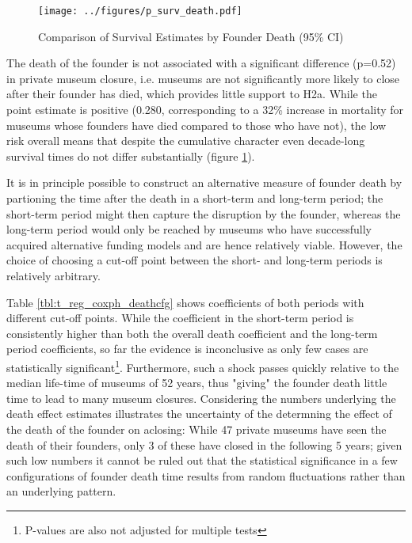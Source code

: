 \documentclass[12pt]{article}
\begin{document}
\begin{figure}[htbp]
\centering
\texttt{[image: ../figures/p\_surv\_death.pdf]}
\caption{\label{fig:p_surv_death}Comparison of Survival Estimates by Founder Death (95\% CI)}
\end{figure}

The death of the founder is not associated with a significant difference (p=0.52) in private museum closure, i.e. museums are not significantly more likely to close after their founder has died, which provides little support to H2a.
While the point estimate is positive (0.280, corresponding to a  32\% increase in mortality for museums whose founders have died compared to those who have not), the low risk overall means that despite the cumulative character even decade-long survival times do not differ substantially (figure \ref{fig:p_surv_death}).


It is in principle possible to construct an alternative measure of founder death by partioning the time after the death in a short-term and long-term period; the short-term period might then capture the disruption by the founder, whereas the long-term period would only be reached by museums who have successfully acquired alternative funding models and are hence relatively viable.
However, the choice of choosing a cut-off point between the short- and long-term periods is relatively arbitrary.


Table \ref{tbl:t_reg_coxph_deathcfg} shows coefficients of both periods with different cut-off points.
While the coefficient in the short-term period is consistently higher than both the overall death coefficient and the long-term period coefficients, so far the evidence is inconclusive as only few cases are statistically significant\footnote{P-values are also not adjusted for multiple tests}.
Furthermore, such a shock passes quickly relative to the median life-time of museums of 52 years, thus "giving" the founder death little time to lead to many museum closures. 
Considering the numbers underlying the death effect estimates illustrates the uncertainty of the determning the effect of the death of the founder on aclosing: 
While 47 private museums have seen the death of their founders, only 3 of these have closed in the following 5 years; given such low numbers it cannot be ruled out that the statistical significance in a few configurations of founder death time results from random fluctuations rather than an underlying pattern.
\end{document}
